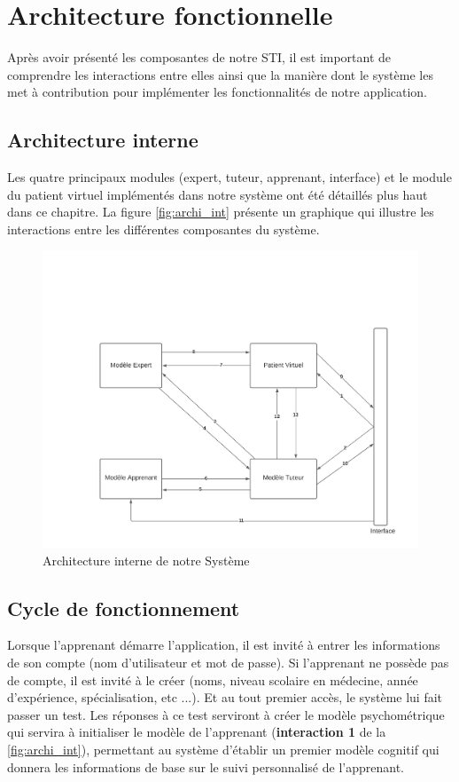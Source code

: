 \section{Architecture fonctionnelle}

Après avoir présenté les composantes de notre STI, il est important de comprendre les interactions entre elles ainsi que la manière dont le système les met à contribution pour implémenter les fonctionnalités de notre application.

\subsection{Architecture interne}

Les quatre principaux modules (expert, tuteur, apprenant, interface) et le module du patient virtuel implémentés dans notre système ont été détaillés plus haut dans ce chapitre. La figure \autoref{fig:archi_int} présente un graphique qui illustre les interactions entre les différentes composantes du système.

\begin{figure}[H]

        \centering
        \includegraphics[width=\textwidth]{figures/archi_interne.png}
        \captionsetup{justification=centering}
        \caption{Architecture interne de notre Système}
        \label{fig:archi_int}
\end{figure}


\subsection{Cycle de fonctionnement}
Lorsque l'apprenant démarre l'application, il est invité à entrer les informations de son compte (nom d'utilisateur et mot de passe). Si l'apprenant ne possède pas de compte, il est invité à le créer (noms, niveau scolaire en médecine, année d'expérience, spécialisation, etc ...). Et au tout premier accès, le système lui fait passer un test. Les réponses à ce test serviront à créer le modèle psychométrique qui servira à initialiser le modèle de l'apprenant (\textbf{interaction 1} de la \autoref{fig:archi_int}), permettant au
système d'établir un premier modèle cognitif qui donnera les informations de base sur le suivi personnalisé de l'apprenant.

